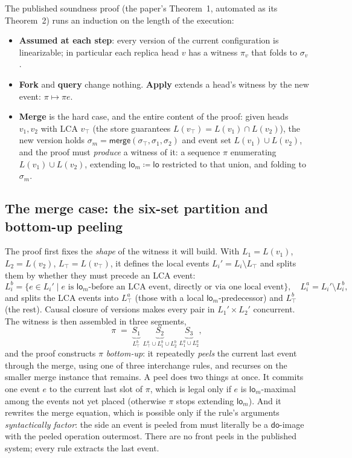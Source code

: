 \documentclass[11pt]{article}
\newcommand{\mergeL}{\mathsf{merge}}
\newcommand{\lom}{\mathsf{lo}_m}
\newcommand{\lopaper}{\mathsf{lo}}
\begin{document}
The published soundness proof (the paper's Theorem~1, automated as its
Theorem~2) runs an induction on the length of the execution:

\begin{itemize}[leftmargin=2em]
\item \textbf{Assumed at each step}: every version of the current
  configuration is linearizable; in particular each replica head $v$
  has a witness $\pi_v$ that folds to $\sigma_v$.
\item \textbf{Fork} and \textbf{query} change nothing.
  \textbf{Apply} extends a head's witness by the new event:
  $\pi \mapsto \pi e$.
\item \textbf{Merge} is the hard case, and the entire content of the
  proof: given heads $v_1, v_2$ with LCA $v_\top$ (the store guarantees
  $L(v_\top) = L(v_1) \cap L(v_2)$), the new version holds
  $\sigma_m = \mergeL(\sigma_\top, \sigma_1, \sigma_2)$ and event set
  $L(v_1) \cup L(v_2)$, and the proof must \emph{produce} a witness of
  it: a sequence $\pi$ enumerating $L(v_1) \cup L(v_2)$, extending
  $\lom \coloneqq \lopaper$ restricted to that union, and folding to
  $\sigma_m$.
\end{itemize}

\subsection{The merge case: the six-set partition and bottom-up peeling}
\label{sec:partition}

The proof first fixes the \emph{shape} of the witness it will build.
With $L_1 = L(v_1)$, $L_2 = L(v_2)$, $L_\top = L(v_\top)$, it defines
the local events $L_i' = L_i \setminus L_\top$ and splits them by
whether they must precede an LCA event:
\[
  L_i^b = \{e \in L_i' \mid e \text{ is } \lom\text{-before an LCA
  event, directly or via one local event}\}, \quad
  L_i^a = L_i' \setminus L_i^b,
\]
and splits the LCA events into $L_\top^a$ (those with a local
$\lom$-predecessor) and $L_\top^b$ (the rest). Causal closure of
versions makes every pair in $L_1' \times L_2'$ concurrent. The
witness is then assembled in three segments,
\[
  \pi \;=\; \underbrace{S_1}_{L_\top^b} \;
  \underbrace{S_2}_{L_\top^a \cup L_1^b \cup L_2^b} \;
  \underbrace{S_3}_{L_1^a \cup L_2^a},
\]
and the proof constructs $\pi$ \emph{bottom-up}: it repeatedly
\emph{peels} the current last event through the merge, using one of
three interchange rules, and recurses on the smaller merge instance
that remains. A peel does two things at once. It commits one event $e$
to the current last slot of $\pi$, which is legal only if $e$ is
$\lom$-maximal among the events not yet placed (otherwise $\pi$ stops
extending $\lom$). And it rewrites the merge equation, which is
possible only if the rule's arguments \emph{syntactically factor}: the
side an event is peeled from must literally be a $\mathsf{do}$-image
with the peeled operation outermost. There are no front peels in the
published system; every rule extracts the last event.
\end{document}
